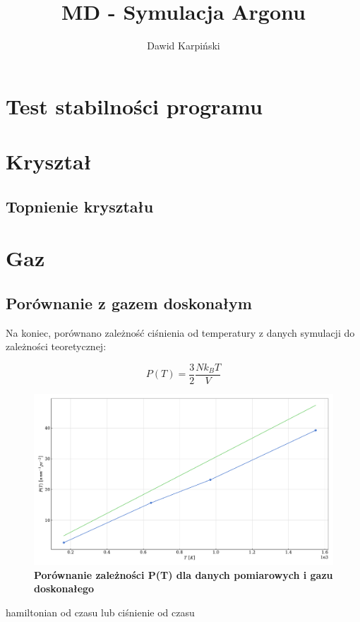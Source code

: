 \documentclass[11pt,a4paper]{article}
\begin{document}
\title{MD - Symulacja Argonu}
\author{Dawid Karpiński}
\date{}
\maketitle

\section{Test stabilności programu}

\section{Kryształ}

\subsection{Topnienie kryształu}

\section{Gaz}

\subsection{Porównanie z gazem doskonałym}
Na koniec, porównano zależność ciśnienia od temperatury z danych symulacji do zależności teoretycznej:

$$
P(T) = \frac{3}{2} \frac{N k_B T}{V}
$$

\begin{figure}[ht!]
    \caption{\textbf{Porównanie zależności P(T) dla danych pomiarowych i gazu doskonałego}}
    \vspace{0.2cm}
    \includegraphics[width=\textwidth]{../figures/P_vs_T.pdf}
\end{figure}

hamiltonian od czasu
lub ciśnienie od czasu
\end{document}

